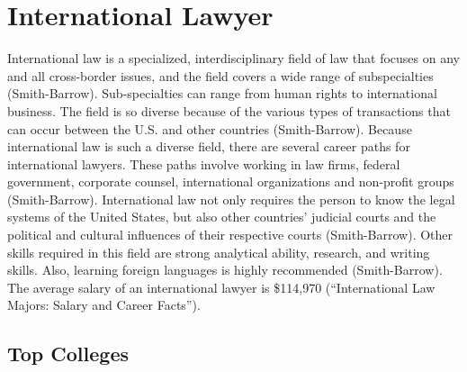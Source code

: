 \chapter{International Lawyer}
\begin{multicols}{2}

International law is a specialized, interdisciplinary field of law that focuses on any and all cross-border issues, and the field covers a wide range of subspecialties (Smith-Barrow). Sub-specialties can range from human rights to international business. The field is so diverse because of the various types of transactions that can occur between the U.S. and other countries (Smith-Barrow). Because international law is such a diverse field, there are several career paths for international lawyers. These paths involve working in law firms, federal government, corporate counsel, international organizations and non-profit groups (Smith-Barrow). International law not only requires the person to know the legal systems of the United States, but also other countries’ judicial courts and the political and cultural influences of their respective courts (Smith-Barrow). Other skills required in this field are strong analytical ability, research, and writing skills. Also, learning foreign languages is highly recommended (Smith-Barrow). The average salary of an international lawyer is \$114,970 (“International Law Majors: Salary and Career Facts”).

\end{multicols}

\section{Top Colleges}

\begin{table}[H]
\centering
\caption{Undergraduate Colleges}
\label{International Lawyer Undergraduate Colleges}
\end{table}

